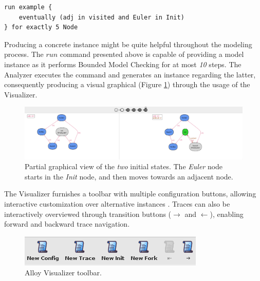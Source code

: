 \begin{lstlisting}[title={Bounded Model Checking: Eventually the graph will represent an \textit{Eulerian} circuit.}, otherkeywords = {run, eventually, in, and, for, exactly, \5, steps}, floatplacement=H]
run example {
    eventually (adj in visited and Euler in Init)
} for exactly 5 Node
\end{lstlisting}

Producing a concrete instance might be quite helpful throughout the modeling process. The $run$ command presented above is capable of providing a model instance as it performs Bounded Model Checking for at most \textit{10} steps. The Analyzer executes the command and generates an instance regarding the latter, consequently producing a visual graphical (Figure \ref{fig:alloy-valid-run}) through the usage of the Visualizer.

\begin{figure}[H]
    \centering
    \includegraphics[width=\linewidth]{images/alloy_run.png}
    \caption{Partial graphical view of the \textit{two} initial states. The \textit{Euler} node starts in the \textit{Init} node, and then moves towards an adjacent node.}
    \label{fig:alloy-valid-run}
\end{figure}

The Visualizer furnishes a toolbar with multiple configuration buttons, allowing interactive customization over alternative instances \cite{alloy-docs}. Traces can also be interactively overviewed through transition buttons ($ \rightarrow $ and $ \leftarrow $), enabling forward and backward trace navigation.

\begin{figure}[H]
    \centering
    \includegraphics[width=0.7\linewidth]{images/alloy_buttons.png}
    \caption{Alloy Visualizer toolbar.}
    \label{fig:alloy-toolbar}
\end{figure}

